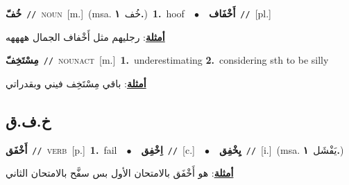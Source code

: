 \documentclass[10pt,a4paper,twoside]{article} %
\begin{document}
\begin{multicols}{2}
{\setlength\topsep{0pt}\textbf{\foreignlanguage{arabic}{خُفّ}}\ {\color{gray}\texttt{//}\color{black}}\ \textsc{noun}\ [m.]\ \color{gray}(msa. \foreignlanguage{arabic}{خُف}~\foreignlanguage{arabic}{\textbf{١.}})\color{black}\ \textbf{1.}~hoof\ \ $\bullet$\ \ \setlength\topsep{0pt}\textbf{\foreignlanguage{arabic}{أَخْفَاف}}\ {\color{gray}\texttt{//}\color{black}}\ [pl.]\  \begin{flushright}\color{gray}\foreignlanguage{arabic}{\textbf{\underline{\foreignlanguage{arabic}{أمثلة}}}: رجليهم مثل أَخْفاف الجمال ههههه}\end{flushright}\color{black}} \vspace{2mm}

{\setlength\topsep{0pt}\textbf{\foreignlanguage{arabic}{مِسْتَخِفّ}}\ {\color{gray}\texttt{//}\color{black}}\ \textsc{noun\textunderscore act}\ [m.]\ \textbf{1.}~underestimating  \textbf{2.}~considering sth to be silly\  \begin{flushright}\color{gray}\foreignlanguage{arabic}{\textbf{\underline{\foreignlanguage{arabic}{أمثلة}}}: باقي مِسْتَخِف فيني وبقدراتي}\end{flushright}\color{black}} \vspace{2mm}

\vspace{-3mm}
\subsection*{\color{blue}\foreignlanguage{arabic}{خ.ف.ق}\color{blue}{}} 

{\setlength\topsep{0pt}\textbf{\foreignlanguage{arabic}{أَخْفَق}}\ {\color{gray}\texttt{//}\color{black}}\ \textsc{verb}\ [p.]\ \textbf{1.}~fail\ \ $\bullet$\ \ \setlength\topsep{0pt}\textbf{\foreignlanguage{arabic}{اِخْفِق}}\ {\color{gray}\texttt{//}\color{black}}\ [c.]\ \ $\bullet$\ \ \setlength\topsep{0pt}\textbf{\foreignlanguage{arabic}{يِخْفِق}}\ {\color{gray}\texttt{//}\color{black}}\ [i.]\ \color{gray}(msa. \foreignlanguage{arabic}{يَفْشَل}~\foreignlanguage{arabic}{\textbf{١.}})\color{black}\  \begin{flushright}\color{gray}\foreignlanguage{arabic}{\textbf{\underline{\foreignlanguage{arabic}{أمثلة}}}: هو أَخْفَق بالامتحان الأول بس سفَّح بالامتحان الثاني}\end{flushright}\color{black}} \vspace{2mm}


\end{multicols}
\end{document}
